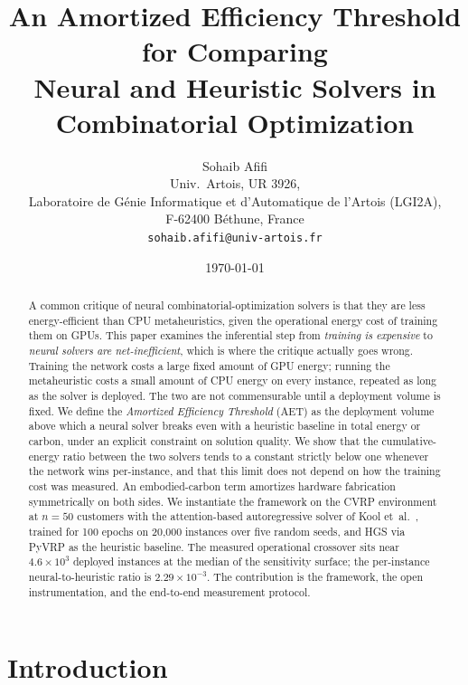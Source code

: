 \documentclass[11pt]{article}
\title{An Amortized Efficiency Threshold for Comparing\\
Neural and Heuristic Solvers in Combinatorial Optimization}
\author{%
Sohaib Afifi\\ Univ.\ Artois, UR 3926,\\ Laboratoire de G\'enie Informatique et d'Automatique de l'Artois (LGI2A),\\ F-62400 B\'ethune, France\\ \texttt{sohaib.afifi@univ-artois.fr}%
}
\date{\today}
\newcommand{\AET}{AET}
\begin{document}
\maketitle

\begin{abstract}
A common critique of neural combinatorial-optimization solvers is that they are less energy-efficient than CPU metaheuristics, given the operational energy cost of training them on GPUs. This paper examines the inferential step from \emph{training is expensive} to \emph{neural solvers are net-inefficient}, which is where the critique actually goes wrong. Training the network costs a large fixed amount of GPU energy; running the metaheuristic costs a small amount of CPU energy on every instance, repeated as long as the solver is deployed. The two are not commensurable until a deployment volume is fixed. We define the \emph{Amortized Efficiency Threshold} (\AET) as the deployment volume above which a neural solver breaks even with a heuristic baseline in total energy or carbon, under an explicit constraint on solution quality. We show that the cumulative-energy ratio between the two solvers tends to a constant strictly below one whenever the network wins per-instance, and that this limit does not depend on how the training cost was measured. An embodied-carbon term amortizes hardware fabrication symmetrically on both sides. We instantiate the framework on the CVRP environment at \(n=50\) customers with the attention-based autoregressive solver of Kool et~al.~\cite{kool2019attention}, trained for 100 epochs on 20{,}000 instances over five random seeds, and HGS via PyVRP as the heuristic baseline. The measured operational crossover sits near \(4.6\times10^{3}\) deployed instances at the median of the sensitivity surface; the per-instance neural-to-heuristic ratio is \(2.29\times10^{-3}\). The contribution is the framework, the open instrumentation, and the end-to-end measurement protocol.
\end{abstract}

\section{Introduction}
\label{sec:intro}
\end{document}
